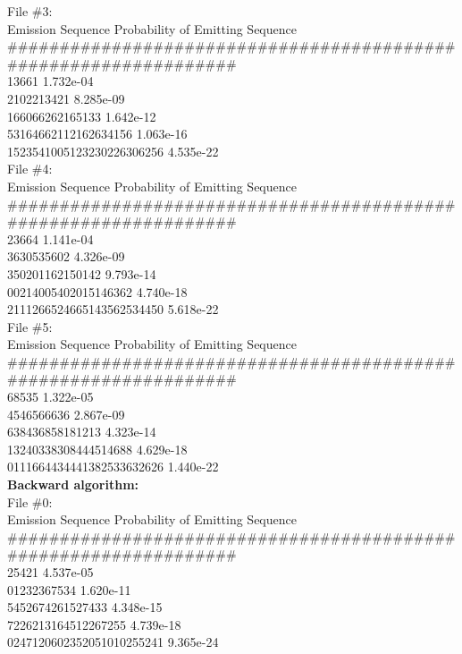 \begin{solution}
  File \#3:\\
  Emission Sequence             Probability of Emitting Sequence\\
  \footnotesize \#\#\#\#\#\#\#\#\#\#\#\#\#\#\#\#\#\#\#\#\#\#\#\#\#\#\#\#\#\#\#\#\#\#\#\#\#\#\#\#\#\#\#\#\#\#\#\#\#\#\#\#\#\#\#\#\#\#\#\#\#\#\#\#\#\\
  13661                         1.732e-04 \\
  2102213421                    8.285e-09 \\
  166066262165133               1.642e-12 \\
  53164662112162634156          1.063e-16 \\
  1523541005123230226306256     4.535e-22 \\
  
  File \#4:\\
  Emission Sequence             Probability of Emitting Sequence\\
  \footnotesize \#\#\#\#\#\#\#\#\#\#\#\#\#\#\#\#\#\#\#\#\#\#\#\#\#\#\#\#\#\#\#\#\#\#\#\#\#\#\#\#\#\#\#\#\#\#\#\#\#\#\#\#\#\#\#\#\#\#\#\#\#\#\#\#\#\\
  23664                         1.141e-04 \\
  3630535602                    4.326e-09 \\
  350201162150142               9.793e-14 \\
  00214005402015146362          4.740e-18 \\
  2111266524665143562534450     5.618e-22 \\
  
  File \#5:\\
  Emission Sequence             Probability of Emitting Sequence\\
  \footnotesize \#\#\#\#\#\#\#\#\#\#\#\#\#\#\#\#\#\#\#\#\#\#\#\#\#\#\#\#\#\#\#\#\#\#\#\#\#\#\#\#\#\#\#\#\#\#\#\#\#\#\#\#\#\#\#\#\#\#\#\#\#\#\#\#\#\\
  68535                         1.322e-05 \\
  4546566636                    2.867e-09 \\
  638436858181213               4.323e-14 \\
  13240338308444514688          4.629e-18 \\
  0111664434441382533632626     1.440e-22 \\
  
  \textbf{Backward algorithm:}\\
  File \#0:\\
  Emission Sequence             Probability of Emitting Sequence\\
  \footnotesize \#\#\#\#\#\#\#\#\#\#\#\#\#\#\#\#\#\#\#\#\#\#\#\#\#\#\#\#\#\#\#\#\#\#\#\#\#\#\#\#\#\#\#\#\#\#\#\#\#\#\#\#\#\#\#\#\#\#\#\#\#\#\#\#\#\\
  25421                         4.537e-05 \\
  01232367534                   1.620e-11 \\
  5452674261527433              4.348e-15 \\
  7226213164512267255           4.739e-18 \\
  0247120602352051010255241     9.365e-24 \\
  

\end{solution}
